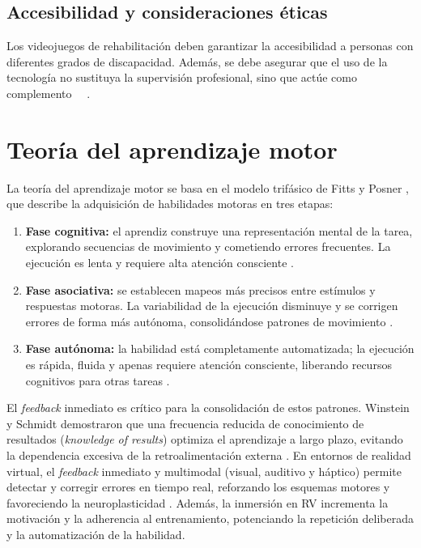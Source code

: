 \subsection{Accesibilidad y consideraciones éticas}

Los videojuegos de rehabilitación deben garantizar la accesibilidad a personas con diferentes grados de discapacidad. Además, se debe asegurar que el uso de la tecnología no sustituya la supervisión profesional, sino que actúe como complemento ~~\cite{rodriguez2020reha}.

\section{Teoría del aprendizaje motor}

La teoría del aprendizaje motor se basa en el modelo trifásico de Fitts y Posner \cite{fitts1967}, que describe la adquisición de habilidades motoras en tres etapas:

\begin{enumerate}
  \item \textbf{Fase cognitiva:} el aprendiz construye una representación mental de la tarea, explorando secuencias de movimiento y cometiendo errores frecuentes. La ejecución es lenta y requiere alta atención consciente \cite{schmidt2019}.
  \item \textbf{Fase asociativa:} se establecen mapeos más precisos entre estímulos y respuestas motoras. La variabilidad de la ejecución disminuye y se corrigen errores de forma más autónoma, consolidándose patrones de movimiento \cite{schmidt2019}.
  \item \textbf{Fase autónoma:} la habilidad está completamente automatizada; la ejecución es rápida, fluida y apenas requiere atención consciente, liberando recursos cognitivos para otras tareas \cite{fitts1967}.
\end{enumerate}

El \emph{feedback} inmediato es crítico para la consolidación de estos patrones. Winstein y Schmidt demostraron que una frecuencia reducida de conocimiento de resultados (\emph{knowledge of results}) optimiza el aprendizaje a largo plazo, evitando la dependencia excesiva de la retroalimentación externa \cite{winstein1991}. En entornos de realidad virtual, el \emph{feedback} inmediato y multimodal (visual, auditivo y háptico) permite detectar y corregir errores en tiempo real, reforzando los esquemas motores y favoreciendo la neuroplasticidad \cite{schmidt2019}. Además, la inmersión en RV incrementa la motivación y la adherencia al entrenamiento, potenciando la repetición deliberada y la automatización de la habilidad.

